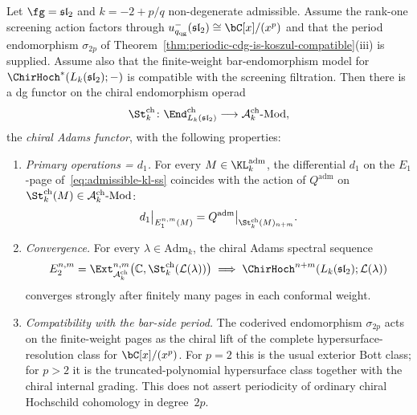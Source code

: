 \begin{theorem}
\label{thm:adams-analog-construction}
%
Let $\fg = \mathfrak{sl}_2$ and $k = -2 + p/q$ non-degenerate
admissible.  Assume the rank-one screening action factors through
$u_{q_{\mathrm{qg}}}^-(\mathfrak{sl}_2)\cong\bC[x]/(x^p)$ and that the
period endomorphism $\sigma_{2p}$ of
Theorem~\ref{thm:periodic-cdg-is-koszul-compatible}(iii) is supplied.
Assume also that the finite-weight bar-endomorphism model for
$\ChirHoch^*(L_k(\mathfrak{sl}_2);-)$ is compatible with the
screening filtration.
Then there is a dg functor on the chiral endomorphism operad
\begin{equation}\label{eq:chiral-adams-functor}
\St^{\mathrm{ch}}_k\colon
\End^{\mathrm{ch}}_{L_k(\mathfrak{sl}_2)}
\longrightarrow
\mathcal{A}^{\mathrm{ch}}_k\text{-}\mathrm{Mod},
\end{equation}
the \emph{chiral Adams functor}, with the following properties:
\begin{enumerate}[label=\textup{(\roman*)}]
\item \emph{Primary operations = $d_1$.} For every
 $M \in \KL_k^{\mathrm{adm}}$, the differential $d_1$ on the
 $E_1$-page of~\eqref{eq:admissible-kl-ss} coincides with the
 action of $Q^{\mathrm{adm}}$ on
 $\St^{\mathrm{ch}}_k(M) \in \mathcal{A}^{\mathrm{ch}}_k\text{-}\mathrm{Mod}$:
 \[
 d_1\big|_{E_1^{n,m}(M)}
 = Q^{\mathrm{adm}}\big|_{\St^{\mathrm{ch}}_k(M)_{n+m}}.
 \]
\item \emph{Convergence.} For every
 $\lambda \in \mathrm{Adm}_k$, the chiral Adams spectral sequence
 \[
 E_2^{n,m} = \Ext^{n,m}_{\mathcal{A}^{\mathrm{ch}}_k}
 \bigl(\mathbb{C}, \St^{\mathrm{ch}}_k(\mathcal{L}(\lambda))\bigr)
 \;\Longrightarrow\;
 \ChirHoch^{n+m}(L_k(\mathfrak{sl}_2); \mathcal{L}(\lambda))
 \]
 converges strongly after finitely many pages in each conformal
 weight.
\item \emph{Compatibility with the bar-side period.} The coderived
 endomorphism $\sigma_{2p}$ acts on the finite-weight pages as the
 chiral lift of the complete hypersurface-resolution class for
 $\bC[x]/(x^p)$.  For $p=2$ this is the usual exterior Bott class; for
 $p>2$ it is the truncated-polynomial hypersurface class together with
 the chiral internal grading.  This does not assert periodicity of
 ordinary chiral Hochschild cohomology in degree~$2p$.
\end{enumerate}
\end{theorem}

